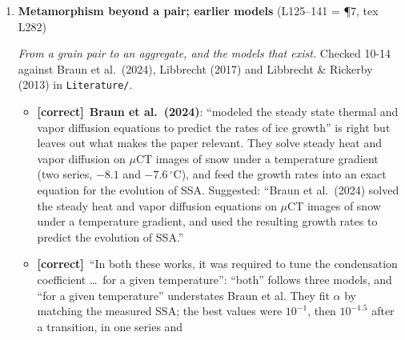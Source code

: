 \documentclass[11pt]{article}
\newcommand{\Pg}[3]{\item \textbf{#1} {\small(#2)}\par\textit{#3}}
\newcommand{\tC}{\textcolor{miss}{\textbf{[correct]}}\ }
\newcommand{\tG}{\textcolor{stale}{\textbf{[wording]}}\ }
\newcommand{\tA}{\textcolor{have}{\textbf{[add]}}\ }
\newcommand{\add}[1]{\textcolor{revB}{#1}}
\begin{document}
\begin{enumerate}
\begin{itemize}
    $\alpha_c$ is an approximation (discussed 09-22).
  \item \tA End on what this paper does: $\alpha_c$ is held constant in each
    study ($10^{-3}$ in the aggregates, $0.1$ for Molaro's experiments) and
    treated as an effective parameter (Section~5.1). Without this the
    paragraph promises a temperature-dependent $\alpha_c$ that the paper does
    not have.
  \item \tG ``Ice growth from vapor transport will occur in response to its
    environmental conditions, governed by'': ``The growth rate of ice from
    vapor depends on''. ``super saturation'': one word. Two spaces and a
    stray space around $v_{\mathrm{kin}}$ and $\sigma_{\mathrm{surf}}$ in the
    source.
  \item \tA (optional) Which limit applies depends on $\alpha_c$ and grain
    size: with $\alpha_c = 10^{-3}$ and 50~$\mu$m grains, attachment and
    diffusion resistances are comparable ($\Lambda \approx 2.8$, scaling
    note). Better placed in Section~2.2 or 5.2; mention here only if it
    helps paragraph~8.
  \end{itemize}
\Pg{Metamorphism beyond a pair; earlier models}{L125--141 \add{= \P7, tex L282}}{From a grain pair to an aggregate, and the models that exist.}
  Checked 10-14 against Braun et al.\ (2024), Libbrecht (2017) and
  Libbrecht \& Rickerby (2013) in \texttt{Literature/}.
  \begin{itemize}
  \item \tC \textbf{Braun et al.\ (2024)}: ``modeled the steady state
    thermal and vapor diffusion equations to predict the rates of ice
    growth'' is right but leaves out what makes the paper relevant. They
    solve steady heat and vapor diffusion on $\mu$CT images of snow under a
    temperature gradient (two series, $-8.1$ and $-7.6\,^{\circ}$C), and
    feed the growth rates into an exact equation for the evolution of SSA.
    Suggested: ``Braun et al.\ (2024) solved the steady heat and vapor
    diffusion equations on $\mu$CT images of snow under a temperature
    gradient, and used the resulting growth rates to predict the evolution
    of SSA.''
  \item \tC ``In both these works, it was required to tune the condensation
    coefficient \ldots\ for a given temperature'': ``both'' follows three
    models, and ``for a given temperature'' understates Braun et al. They
    fit $\alpha$ by matching the measured SSA; the best values were
    $10^{-1}$, then $10^{-1.5}$ after a transition, in one series and

\end{itemize}
\end{enumerate}
\end{document}
